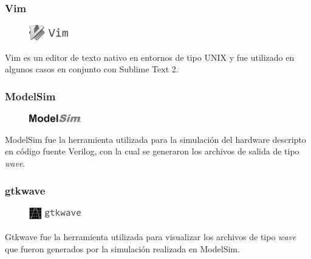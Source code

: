 \subsubsection*{Vim}
\begin{figure}
	\vspace{-20pt}
	\begin{center}
		\includegraphics[width=0.15\textwidth]{./figures/C04-logo_vim}
	\end{center}
	\vspace{-20pt}
\end{figure}
Vim es un editor de texto nativo en entornos de tipo UNIX y fue utilizado en algunos casos en conjunto con Sublime Text 2.

\subsubsection*{ModelSim}
\begin{figure}
	\vspace{-15pt}
	\begin{center}
		\includegraphics[width=0.20\textwidth]{./figures/C04-logo_modelsim}
	\end{center}
	\vspace{-15pt}
\end{figure}
ModelSim fue la herramienta utilizada para la simulación del hardware descripto en código fuente Verilog, con la cual se generaron los archivos de salida de tipo \textit{wave}.

\subsubsection*{gtkwave}
\begin{figure}
	\vspace{-15pt}
	\begin{center}
		\includegraphics[width=0.20\textwidth]{./figures/C04-logo_gtkwave}
	\end{center}
	\vspace{-15pt}
\end{figure}
Gtkwave fue la herramienta utilizada para visualizar los archivos de tipo \textit{wave} que fueron generados por la simulación realizada en ModelSim.

